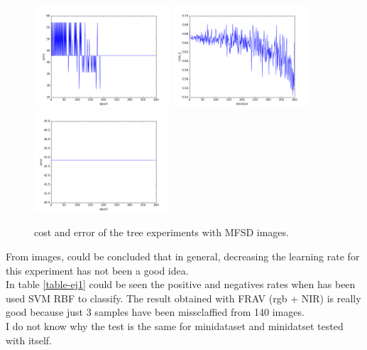\begin{figure}[htb]
\includegraphics[width=0.45\textwidth]{images/redes/ejecucion1/general_svm_mfsd/minidataset_tested_itself/error.png}
\includegraphics[width=0.45\textwidth]{images/redes/ejecucion1/general_svm_mfsd/minidataset_tested_iteself_lr_0_001/cost.png}
\includegraphics[width=0.45\textwidth]{images/redes/ejecucion1/general_svm_mfsd/minidataset_tested_iteself_lr_0_001/error.png}
\caption{cost and error of the tree experiments with MFSD images.} \label{fig:mfsd-ejec1}
\end{figure}

From images, could be concluded that in general, decreasing the learning rate for this experiment has not been a good idea.\\

In table \ref{table-ej1} could be seen the positive and negatives rates when has been used SVM RBF to classify. The result obtained with FRAV (rgb + NIR) is really good because just 3 samples have been missclaffied from 140 images.\\

I do not know why the test is the same for minidataset and minidatset tested with itself.\\

